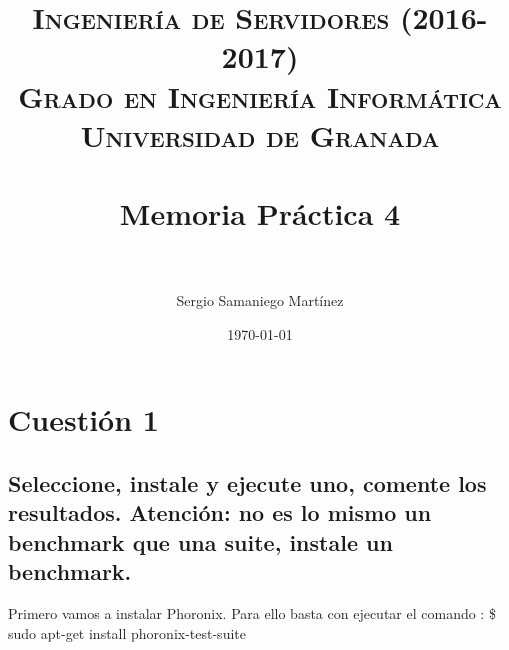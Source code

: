 


\title{	
\normalfont \normalsize 
\textsc{\textbf{Ingeniería de Servidores (2016-2017)} \\ Grado en Ingeniería Informática \\ Universidad de Granada} \\ [25pt] %
\horrule{0.5pt} \\[0.4cm] %
\huge Memoria Práctica 4 \\ %
\horrule{2pt} \\[0.5cm] %
}

\author{Sergio Samaniego Martínez} %

\date{\normalsize\today} %




\maketitle %

\newpage %

\tableofcontents %


\newpage


\section{Cuestión 1}
\subsection{\Large Seleccione, instale y ejecute uno, comente los resultados. Atención: no es lo mismo un benchmark que una suite, instale un benchmark.}
Primero vamos a instalar Phoronix. 
Para ello basta con ejecutar el comando : \$ sudo apt-get install phoronix-test-suite

